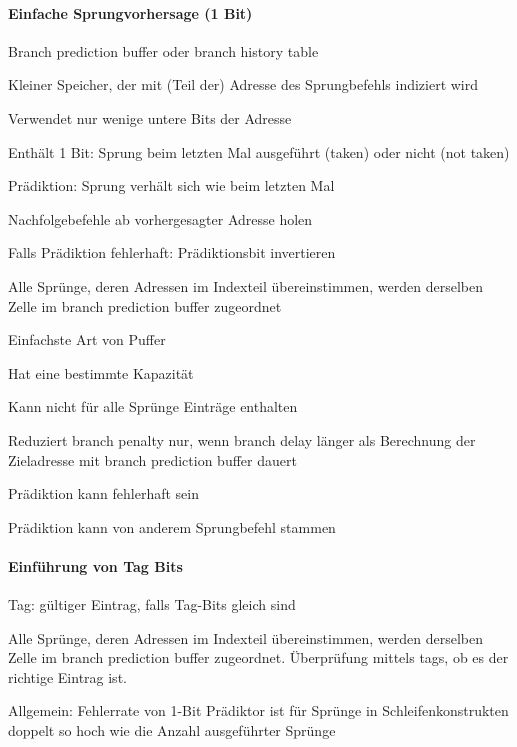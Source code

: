 \documentclass[10pt,landscape]{article}
\begin{document}
\begin{multicols}{3}
  \paragraph{Einfache Sprungvorhersage (1 Bit)}
  \begin{itemize*}
    \item Branch prediction buffer oder branch history table
    \item Kleiner Speicher, der mit (Teil der) Adresse des Sprungbefehls indiziert wird
    \item Verwendet nur wenige untere Bits der Adresse
    \item Enthält 1 Bit: Sprung beim letzten Mal ausgeführt (taken) oder nicht (not taken)
    \item Prädiktion: Sprung verhält sich wie beim letzten Mal
    \item Nachfolgebefehle ab vorhergesagter Adresse holen
    \item Falls Prädiktion fehlerhaft: Prädiktionsbit invertieren
    \item Alle Sprünge, deren Adressen im Indexteil übereinstimmen, werden derselben Zelle im branch prediction buffer zugeordnet
    \item Einfachste Art von Puffer
    \item Hat eine bestimmte Kapazität
    \item Kann nicht für alle Sprünge Einträge enthalten
    \item Reduziert branch penalty nur, wenn branch delay länger als Berechnung der Zieladresse mit branch prediction buffer dauert
    \item Prädiktion kann fehlerhaft sein
    \item Prädiktion kann von anderem Sprungbefehl stammen
  \end{itemize*}
  
  \paragraph{Einführung von Tag Bits}
  \begin{itemize*}
    \item Tag: gültiger Eintrag, falls Tag-Bits gleich sind
    \item Alle Sprünge, deren Adressen im Indexteil übereinstimmen, werden derselben Zelle im branch prediction buffer zugeordnet. Überprüfung mittels tags, ob es der richtige Eintrag ist.
    \item Allgemein: Fehlerrate von 1-Bit Prädiktor ist für Sprünge in Schleifenkonstrukten doppelt so hoch wie die Anzahl ausgeführter Sprünge
  \end{itemize*}
  

\end{multicols}
\end{document}
